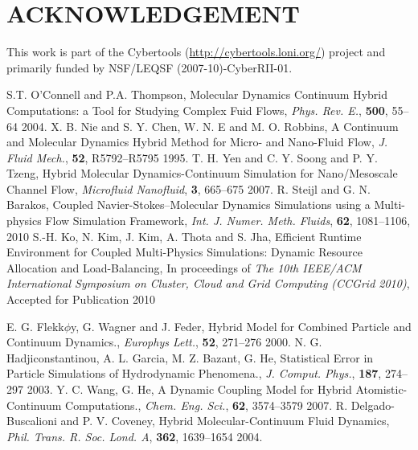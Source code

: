 \documentclass{CFD2010paper}
\begin{document}
\section*{ACKNOWLEDGEMENT}
This work is part of the Cybertools (\underline {http://cybertools.loni.org/}) project and primarily funded by NSF/LEQSF (2007-10)-CyberRII-01.


\begin{thebibliography}{99}



 S.T. O'Connell and P.A. Thompson, Molecular Dynamics Continuum Hybrid Computations: a Tool for Studying Complex Fuid Flows, \textit{Phys. Rev. E.}, \textbf{500}, 55--64 {2004}.
 X. B. Nie and S. Y. Chen, W. N. E and M. O. Robbins, A Continuum and Molecular Dynamics Hybrid Method for Micro- and Nano-Fluid Flow, \textit{J. Fluid Mech.}, \textbf{52}, R5792--R5795 {1995}.
 T. H. Yen and C. Y. Soong and P. Y. Tzeng, Hybrid Molecular Dynamics-Continuum Simulation for Nano/Mesoscale Channel Flow, \textit{Microfluid Nanofluid}, \textbf{3}, 665--675 {2007}.
 R. Steijl and G. N. Barakos, Coupled Navier-Stokes--Molecular Dynamics Simulations using a Multi-physics Flow Simulation Framework, \textit{Int. J. Numer. Meth. Fluids}, \textbf{62}, 1081--1106, {2010}
 S.-H. Ko, N. Kim, J. Kim, A. Thota and S. Jha, Efficient Runtime Environment for Coupled Multi-Physics Simulations: Dynamic Resource Allocation and Load-Balancing, In proceedings of \textit{The 10th IEEE/ACM International Symposium on Cluster, Cloud and Grid Computing (CCGrid 2010)}, Accepted for Publication {2010}

 E. G. Flekk$\phi$y, G. Wagner and J. Feder, Hybrid Model for Combined Particle and Continuum Dynamics., \textit{Europhys Lett.}, \textbf{52}, 271--276 {2000}.
 N. G. Hadjiconstantinou, A. L. Garcia, M. Z. Bazant, G. He, Statistical Error in Particle Simulations of Hydrodynamic Phenomena., \textit{J. Comput. Phys.}, \textbf{187}, 274--297 {2003}.
 Y. C. Wang, G. He, A Dynamic Coupling Model for Hybrid Atomistic-Continuum Computations., \textit{Chem. Eng. Sci.}, \textbf{62}, 3574--3579 {2007}.
 R. Delgado-Buscalioni and P. V. Coveney, Hybrid Molecular-Continuum Fluid Dynamics, \textit{Phil. Trans. R. Soc. Lond. A}, \textbf{362}, 1639--1654 {2004}.


\end{thebibliography}
\end{document}
